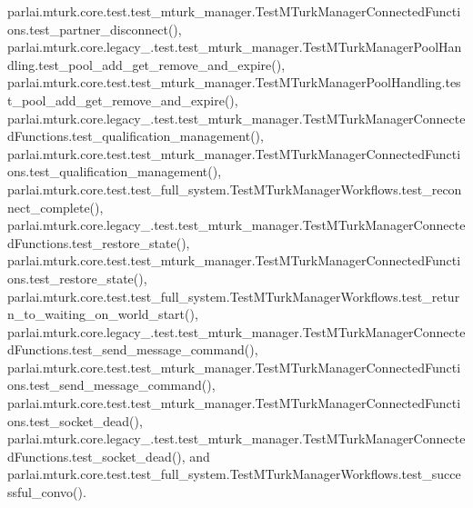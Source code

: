 parlai.\+mturk.\+core.\+test.\+test\+\_\+mturk\+\_\+manager.\+Test\+M\+Turk\+Manager\+Connected\+Functions.\+test\+\_\+partner\+\_\+disconnect(), parlai.\+mturk.\+core.\+legacy\+\_.\+test.\+test\+\_\+mturk\+\_\+manager.\+Test\+M\+Turk\+Manager\+Pool\+Handling.\+test\+\_\+pool\+\_\+add\+\_\+get\+\_\+remove\+\_\+and\+\_\+expire(), parlai.\+mturk.\+core.\+test.\+test\+\_\+mturk\+\_\+manager.\+Test\+M\+Turk\+Manager\+Pool\+Handling.\+test\+\_\+pool\+\_\+add\+\_\+get\+\_\+remove\+\_\+and\+\_\+expire(), parlai.\+mturk.\+core.\+legacy\+\_.\+test.\+test\+\_\+mturk\+\_\+manager.\+Test\+M\+Turk\+Manager\+Connected\+Functions.\+test\+\_\+qualification\+\_\+management(), parlai.\+mturk.\+core.\+test.\+test\+\_\+mturk\+\_\+manager.\+Test\+M\+Turk\+Manager\+Connected\+Functions.\+test\+\_\+qualification\+\_\+management(), parlai.\+mturk.\+core.\+test.\+test\+\_\+full\+\_\+system.\+Test\+M\+Turk\+Manager\+Workflows.\+test\+\_\+reconnect\+\_\+complete(), parlai.\+mturk.\+core.\+legacy\+\_.\+test.\+test\+\_\+mturk\+\_\+manager.\+Test\+M\+Turk\+Manager\+Connected\+Functions.\+test\+\_\+restore\+\_\+state(), parlai.\+mturk.\+core.\+test.\+test\+\_\+mturk\+\_\+manager.\+Test\+M\+Turk\+Manager\+Connected\+Functions.\+test\+\_\+restore\+\_\+state(), parlai.\+mturk.\+core.\+test.\+test\+\_\+full\+\_\+system.\+Test\+M\+Turk\+Manager\+Workflows.\+test\+\_\+return\+\_\+to\+\_\+waiting\+\_\+on\+\_\+world\+\_\+start(), parlai.\+mturk.\+core.\+legacy\+\_.\+test.\+test\+\_\+mturk\+\_\+manager.\+Test\+M\+Turk\+Manager\+Connected\+Functions.\+test\+\_\+send\+\_\+message\+\_\+command(), parlai.\+mturk.\+core.\+test.\+test\+\_\+mturk\+\_\+manager.\+Test\+M\+Turk\+Manager\+Connected\+Functions.\+test\+\_\+send\+\_\+message\+\_\+command(), parlai.\+mturk.\+core.\+test.\+test\+\_\+mturk\+\_\+manager.\+Test\+M\+Turk\+Manager\+Connected\+Functions.\+test\+\_\+socket\+\_\+dead(), parlai.\+mturk.\+core.\+legacy\+\_.\+test.\+test\+\_\+mturk\+\_\+manager.\+Test\+M\+Turk\+Manager\+Connected\+Functions.\+test\+\_\+socket\+\_\+dead(), and parlai.\+mturk.\+core.\+test.\+test\+\_\+full\+\_\+system.\+Test\+M\+Turk\+Manager\+Workflows.\+test\+\_\+successful\+\_\+convo().

\mbox{\label{classparlai_1_1mturk_1_1core_1_1legacy__2018_1_1test_1_1test__mturk__manager_1_1TestMTurkManagerPoolHandling_ae4d91650b01d307c35397d62bdf06221}} 
